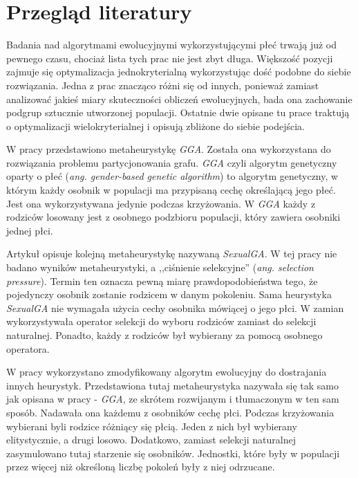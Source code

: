 \documentclass[./FM_mgr.tex]{subfiles}
\begin{document}
\section{Przegląd literatury} \label{chapter:literature}

Badania nad algorytmami ewolucyjnymi wykorzystującymi płeć trwają już od pewnego czasu, chociaż lista tych prac nie jest zbyt długa.
Większość pozycji zajmuje się optymalizacja jednokryterialną wykorzystując dość podobne do siebie rozwiązania.
Jedna z prac znacząco różni się od innych, ponieważ zamiast analizować jakieś miary skuteczności obliczeń ewolucyjnych, bada ona zachowanie podgrup sztucznie utworzonej populacji.
Ostatnie dwie opisane tu prace traktują o optymalizacji wielokryterialnej i opisują zbliżone do siebie podejścia.


W pracy \cite{GGA} przedstawiono metaheurystykę \emph{GGA}.
Została ona wykorzystana do rozwiązania problemu partycjonowania grafu.
\emph{GGA} czyli algorytm genetyczny oparty o płeć (\emph{ang. gender-based genetic algorithm}) to algorytm genetyczny, w którym każdy osobnik w populacji ma przypisaną cechę określającą jego płeć.
Jest ona wykorzystywana jedynie podczas krzyżowania.
W \emph{GGA} każdy z rodziców losowany jest z osobnego podzbioru populacji, który zawiera osobniki jednej płci.

Artykuł \cite{SexualGA} opisuje kolejną metaheurystykę nazywaną \emph{SexualGA}.
W tej pracy nie badano wyników metaheurystyki, a ,,ciśnienie selekcyjne'' (\emph{ang. selection pressure}).
Termin ten oznacza pewną miarę prawdopodobieństwa tego, że pojedynczy osobnik zostanie rodzicem w danym pokoleniu.
Sama heurystyka \emph{SexualGA} nie wymagała użycia cechy osobnika mówiącej o jego płci.
W zamian wykorzystywała operator selekcji do wyboru rodziców zamiast do selekcji naturalnej.
Ponadto, każdy z rodziców był wybierany za pomocą osobnego operatora.

W pracy \cite{ansotegui} wykorzystano zmodyfikowany algorytm ewolucyjny do dostrajania innych heurystyk.
Przedstawiona tutaj metaheurystyka nazywała się tak samo jak opisana w pracy \cite{GGA} - \emph{GGA}, ze skrótem rozwijanym i tłumaczonym w ten sam sposób.
Nadawała ona każdemu z osobników cechę płci.
Podczas krzyżowania wybierani byli rodzice różniący się płcią.
Jeden z nich był wybierany elitystycznie, a drugi losowo.
Dodatkowo, zamiast selekcji naturalnej zasymulowano tutaj starzenie się osobników.
Jednostki, które były w populacji przez więcej niż określoną liczbę pokoleń były z niej odrzucane.
\end{document}
